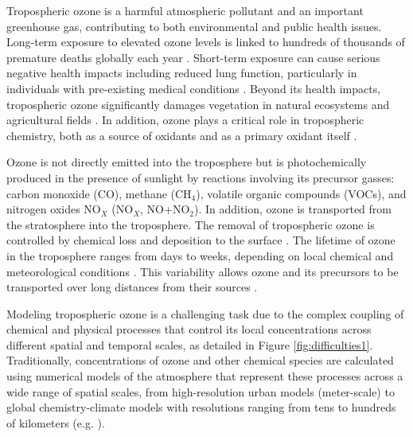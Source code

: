 \documentclass[gmd, manuscript]{copernicus}
\begin{document}



\introduction  %
Tropospheric ozone is a harmful atmospheric pollutant and an important greenhouse gas, contributing to both environmental and public health issues. Long-term exposure to elevated ozone levels is linked to hundreds of thousands of premature deaths globally each year \citep{malashock_global_2022, malley_updated_2017, health_effects_institute_state_2024}. Short-term exposure can cause serious negative health impacts \citep{bell_who_2014} including reduced lung function, particularly in individuals with pre-existing medical conditions \citep{us2020integrated}. Beyond its health impacts, tropospheric ozone significantly damages vegetation in natural ecosystems and agricultural fields \citep{mills_ozone_2018}. In addition, ozone plays a critical role in tropospheric chemistry, both as a source of oxidants and as a primary oxidant itself \citep{monks_tropospheric_2015}.

Ozone is not directly emitted into the troposphere but is photochemically produced in the presence of sunlight by reactions involving its precursor gasses: carbon monoxide (CO), methane (CH$_4$), volatile organic compounds (VOCs), and nitrogen oxides NO$_X$ (NO$_X$, NO+NO$_2$). In addition, ozone is transported from the stratosphere into the troposphere. The removal of tropospheric ozone is controlled by chemical loss and deposition to the surface \citep{archibald_tropospheric_2020}. The lifetime of ozone in the troposphere ranges from days to weeks, depending on local chemical and meteorological conditions \citep{lelieveld_what_2000, monks_tropospheric_2015}. This variability allows ozone and its precursors to be transported over long distances from their sources \citep{fiore_multimodel_2009}.

Modeling tropospheric ozone is a challenging task due to the complex coupling of chemical and physical processes that control its local concentrations across different spatial and temporal scales, as detailed in Figure \ref{fig:difficulties1}. Traditionally, concentrations of ozone and other chemical species are calculated using numerical models of the atmosphere that represent these processes across a wide range of spatial scales, from high-resolution urban models (meter-scale) to global chemistry-climate models with resolutions ranging from tens to hundreds of kilometers (e.g. \citet{Morgenstern2017}). 
\end{document}
